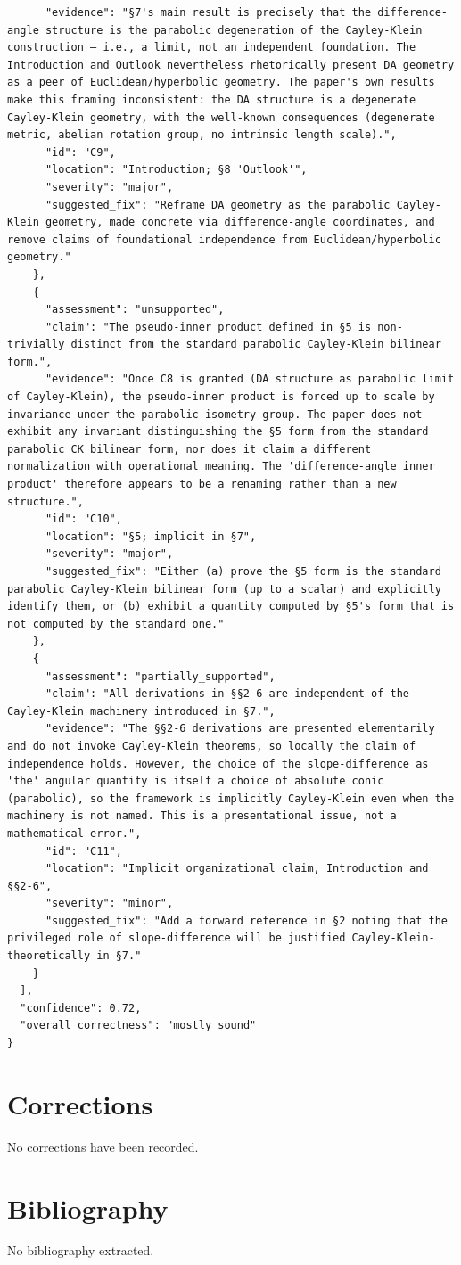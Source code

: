 \documentclass[11pt]{article}
\begin{document}
\begin{verbatim}
      "evidence": "§7's main result is precisely that the difference-angle structure is the parabolic degeneration of the Cayley-Klein construction — i.e., a limit, not an independent foundation. The Introduction and Outlook nevertheless rhetorically present DA geometry as a peer of Euclidean/hyperbolic geometry. The paper's own results make this framing inconsistent: the DA structure is a degenerate Cayley-Klein geometry, with the well-known consequences (degenerate metric, abelian rotation group, no intrinsic length scale).",
      "id": "C9",
      "location": "Introduction; §8 'Outlook'",
      "severity": "major",
      "suggested_fix": "Reframe DA geometry as the parabolic Cayley-Klein geometry, made concrete via difference-angle coordinates, and remove claims of foundational independence from Euclidean/hyperbolic geometry."
    },
    {
      "assessment": "unsupported",
      "claim": "The pseudo-inner product defined in §5 is non-trivially distinct from the standard parabolic Cayley-Klein bilinear form.",
      "evidence": "Once C8 is granted (DA structure as parabolic limit of Cayley-Klein), the pseudo-inner product is forced up to scale by invariance under the parabolic isometry group. The paper does not exhibit any invariant distinguishing the §5 form from the standard parabolic CK bilinear form, nor does it claim a different normalization with operational meaning. The 'difference-angle inner product' therefore appears to be a renaming rather than a new structure.",
      "id": "C10",
      "location": "§5; implicit in §7",
      "severity": "major",
      "suggested_fix": "Either (a) prove the §5 form is the standard parabolic Cayley-Klein bilinear form (up to a scalar) and explicitly identify them, or (b) exhibit a quantity computed by §5's form that is not computed by the standard one."
    },
    {
      "assessment": "partially_supported",
      "claim": "All derivations in §§2-6 are independent of the Cayley-Klein machinery introduced in §7.",
      "evidence": "The §§2-6 derivations are presented elementarily and do not invoke Cayley-Klein theorems, so locally the claim of independence holds. However, the choice of the slope-difference as 'the' angular quantity is itself a choice of absolute conic (parabolic), so the framework is implicitly Cayley-Klein even when the machinery is not named. This is a presentational issue, not a mathematical error.",
      "id": "C11",
      "location": "Implicit organizational claim, Introduction and §§2-6",
      "severity": "minor",
      "suggested_fix": "Add a forward reference in §2 noting that the privileged role of slope-difference will be justified Cayley-Klein-theoretically in §7."
    }
  ],
  "confidence": 0.72,
  "overall_correctness": "mostly_sound"
}
\end{verbatim}

\section*{Corrections}
No corrections have been recorded.

\section*{Bibliography}
No bibliography extracted.

% 
% 
\end{document}
